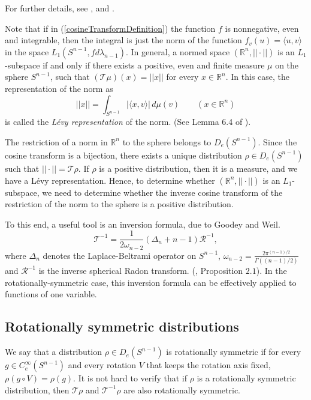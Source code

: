 \documentclass{article}[1100]
\theoremstyle{definition}
\theoremstyle{remark}
\newcommand\innerproduct[2]{\langle #1,#2\rangle}
\newcommand\Ren[1]{\mathbb{R}^{#1}}
\newcommand\norma[1]{|\!|#1|\!|}
\newcommand\distributionSpace{D_e(\sphere{n-1})}
\newcommand\sphere[1]{S^{#1}}
\newcommand{\CT}{\mathcal T}
\newcommand{\inverseCT}{{\mathcal T}^{-1}}
\begin{document}
\noindent For further details, see \cite{GardnerBook}, \cite{GW1992} and \cite{weil76}.

\medskip

Note that if in (\ref{cosineTransformDefinition}) the function $f$ is nonnegative, even and integrable, then the integral is just the norm of the function $f_v(u)=\innerproduct{u}{v}$ in the space $L_1(\sphere{n-1},fd\lambda_{n-1})$. In general, a normed space $(\Ren{n},\norma{\cdot})$ is
an $L_1$-subspace if and only if there exists a positive, even and finite measure $\mu$ on the sphere $\sphere{n-1}$, such that $(\CT\mu)(x)=\norma{x}$ for every $x\in\Ren{n}$.
In this case, the representation of the norm as
\begin{equation}\label{LevyRepresentation}
\norma{x}=\int_{\sphere{n-1}}|\innerproduct{x}{v}|\,d\mu(v)\qquad (x\in\Ren{n})
\end{equation}
is called the \emph{L{\'e}vy representation} of the norm. (See Lemma 6.4 of \cite{kol1992}).

The restriction of a norm in $\Ren{n}$ to the sphere belongs to $\distributionSpace$. Since the cosine transform is a bijection, there exists a unique distribution $\rho\in\distributionSpace$ such that $\norma{\cdot}=\CT\rho$. If $\rho$ is a positive distribution, then it is a measure, and we have  a L{\'e}vy representation. Hence, to determine whether $(\Ren{n},\norma{\cdot})$ is an $L_1$-subspace,  we need to determine whether the inverse cosine transform of the restriction of the norm to the sphere is a positive distribution.

To this end, a useful tool is an inversion formula, due to Goodey and Weil.
\begin{equation}\label{GWinversionFormula}
\inverseCT=\frac{1}{2\omega_{n-2}}(\Delta_n+n-1){\mathcal R}^{-1},
\end{equation}
where $\Delta_n$ denotes the Laplace-Beltrami operator on $\sphere{n-1}$, $\omega_{n-2}=\frac{2\pi^{(n-1)/2}}{\Gamma((n-1)/2)}$ and
${\mathcal R}^{-1}$ is the inverse spherical Radon transform. (\cite{GW1992}, Proposition $2.1$). In the rotationally-symmetric case, this inversion formula can be effectively applied to functions of one variable. 

\medskip

\subsection*{Rotationally symmetric distributions}

We say that a  distribution $\rho\in D_e(\sphere{n-1})$ is rotationally symmetric if for every $g\in C_e^\infty(\sphere{n-1})$ and every rotation $V$ that keeps the rotation axis  fixed,
$\rho(g\circ V)=\rho(g)$. It is not hard to verify that if $\rho$ is a rotationally symmetric distribution, then $\CT \rho$ and $\inverseCT \rho$ are also rotationally symmetric.
\end{document}
